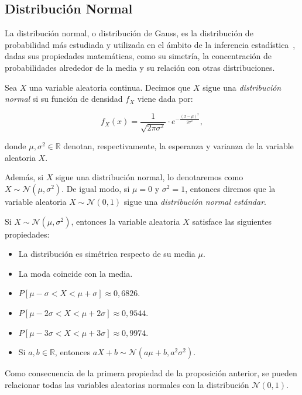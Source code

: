 \subsection{Distribución Normal}
La distribución normal, o distribución de Gauss, es la distribución de probabilidad más estudiada y utilizada en el ámbito de la inferencia estadística~\cite{Bryc1995TheND}, dadas sus propiedades matemáticas, como su simetría, la concentración de probabilidades alrededor de la media y su relación con otras distribuciones.

\begin{definicion}
    Sea $X$ una variable aleatoria continua. Decimos que $X$ sigue una \emph{distribución normal} si su función de densidad $f_X$ viene dada por:

    \[ f_X(x) = \frac{1}{\sqrt{2\pi \sigma^2}} \cdot e^{-\frac{{(x - \mu)}^2}{2\sigma^2}}, \]

    donde $\mu, \sigma^2 \in \mathbb{R}$ denotan, respectivamente, la esperanza y varianza de la variable aleatoria $X$.

    Además, si $X$ sigue una distribución normal, lo denotaremos como $X \sim \mathcal{N}(\mu,\sigma^2)$. De igual modo, si $\mu = 0$ y $\sigma^2=1$, entonces diremos que la variable aleatoria $X \sim \mathcal{N}(0,1)$ sigue una \emph{distribución normal estándar}.
\end{definicion}

\begin{proposicion}
    Si $X \sim \mathcal{N}(\mu,\sigma^2)$, entonces la variable aleatoria $X$ satisface las siguientes propiedades:

    \begin{itemize}
        \item La distribución es simétrica respecto de su media $\mu$.
        \item La moda coincide con la media.
        \item $P[\mu - \sigma < X < \mu + \sigma] \approx 0,6826$.
        \item $P[\mu - 2\sigma < X < \mu + 2\sigma] \approx 0,9544$.
        \item $P[\mu - 3\sigma < X < \mu + 3\sigma] \approx 0,9974$.
        \item Si $a, b \in \mathbb{R}$, entonces $aX + b \sim \mathcal{N}(a\mu + b, a^2\sigma^2)$.
    \end{itemize}
\end{proposicion}

Como consecuencia de la primera propiedad de la proposición anterior, se pueden relacionar todas las variables aleatorias normales con la distribución $\mathcal{N}(0,1)$.

